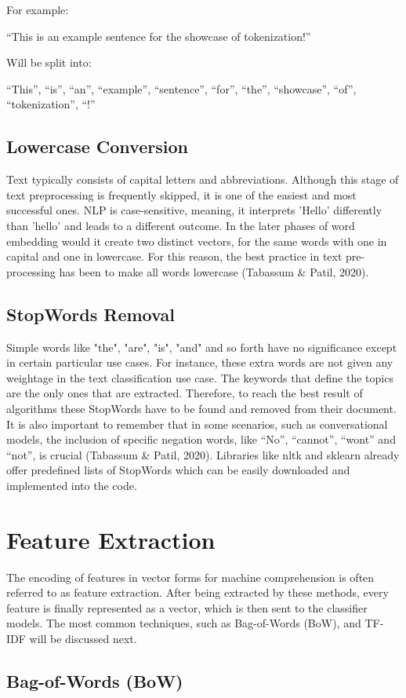 For example:

“This is an example sentence for the showcase of tokenization!”

Will be split into:

“This”, “is”, “an”, “example”, “sentence”, “for”, “the”, “showcase”, “of”, “tokenization”, “!”

\subsection{Lowercase Conversion}

Text typically consists of capital letters and abbreviations. Although this stage of text preprocessing is frequently skipped, it is one of the easiest and most successful ones. NLP is case-sensitive, meaning, it interprets 'Hello' differently than 'hello' and leads to a different outcome. In the later phases of word embedding would it create two distinct vectors, for the same words with one in capital and one in lowercase. For this reason, the best practice in text pre-processing has been to make all words lowercase (Tabassum \& Patil, 2020).

\subsection{StopWords Removal}

Simple words like "the", "are", "is", "and" and so forth have no significance except in certain particular use cases. For instance, these extra words are not given any weightage in the text classification use case. The keywords that define the topics are the only ones that are extracted. Therefore, to reach the best result of algorithms these StopWords have to be found and removed from their document. It is also important to remember that in some scenarios, such as conversational models, the inclusion of specific negation words, like “No”, “cannot”, “wont” and “not”, is crucial (Tabassum \& Patil, 2020). Libraries like nltk and sklearn already offer predefined lists of StopWords which can be easily downloaded and implemented into the code.

\section{Feature Extraction}

The encoding of features in vector forms for machine comprehension is often referred to as feature extraction. After being extracted by these methods, every feature is finally represented as a vector, which is then sent to the classifier models. The most common techniques, such as Bag-of-Words (BoW), and TF-IDF will be discussed next.

\subsection{Bag-of-Words (BoW)}

